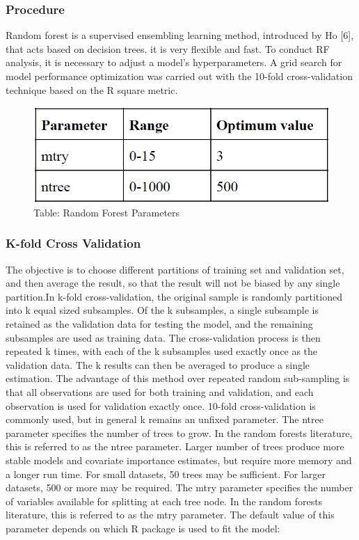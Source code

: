 \subsubsection{Procedure}
Random forest is a supervised ensembling
learning method, introduced by Ho [6], that acts
based on decision trees. it is very flexible
and fast. To conduct RF analysis, it is necessary
to adjust a model’s hyperparameters. A grid
search for model performance optimization was
carried out with the 10-fold cross-validation
technique based on the R square metric.
\begin{figure}[h]
\label{ss}
\centering
\includegraphics[width= 10 cm]{rftable.png}
\caption{Table: Random Forest Parameters}
\end{figure}

\subsubsection{K-fold Cross Validation}
The objective is to choose different partitions of training set and validation set, and then average the result, so that the result will not be biased by any single partition.In k-fold cross-validation, the original sample is randomly partitioned into k equal sized subsamples. Of the k subsamples, a single subsample is retained as the validation data for testing the model, and the remaining subsamples are used as training data. The cross-validation process is then repeated k times, with each of the k subsamples used exactly once as the validation data. The k results can then be averaged to produce a single estimation. The advantage of this method over repeated random sub-sampling is that all observations are used for both training and validation, and each observation is used for validation exactly once. 10-fold cross-validation is commonly used, but in general k remains an unfixed parameter.
The ntree parameter specifies the number of trees to grow. In the random forests literature, this is referred to as the ntree parameter. Larger number of trees produce more stable models and covariate importance estimates, but require more memory and a longer run time. For small datasets, 50 trees may be sufficient. For larger datasets, 500 or more may be required.
The mtry parameter specifies the number of variables available for splitting at each tree node. In the random forests literature, this is referred to as the mtry parameter. The default value of this parameter depends on which R package is used to fit the model:

